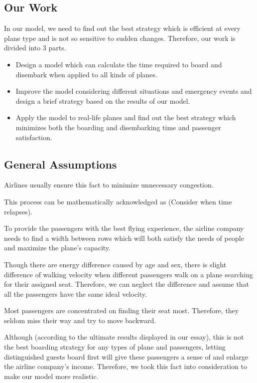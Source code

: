 \documentclass{article}
\theoremstyle{definition}
\theoremstyle{remark}
\numberwithin{equation}{section}
\begin{document}
	\subsection{Our Work}
	In our model, we need to find out the best strategy which is efficient at every plane type and is not so sensitive to sudden changes. Therefore, our work is divided into 3 parts.
	\begin{itemize}
		\item Design a model which can calculate the time required to board and disembark when applied to all kinds of planes.
		\item Improve the model considering different situations and emergency events and design a brief strategy based on the results of our model.
		\item Apply the model to real-life planes and find out the best strategy which minimizes both the boarding and disembarking time and passenger satisfaction.
	\end{itemize}
	\subsection{General Assumptions}
	\begin{enumerate}

		Airlines usually ensure this fact to minimize unnecessary congestion.

		This process can be mathematically acknowledged as  (Consider when time relapses).

		To provide the passengers with the best flying experience, the airline company needs to find a width between rows which will both satisfy the needs of people and maximize the plane's capacity.

		Though there are energy difference caused by age and sex, there is slight difference of walking velocity when different passengers walk on a plane searching for their assigned seat. Therefore, we can neglect the difference and assume that all the passengers have the same ideal velocity.

		Most passengers are concentrated on finding their seat most. Therefore, they seldom miss their way and try to move backward.

		Although (according to the ultimate results displayed in our essay), this is not the best boarding strategy for any types of plane and passengers, letting distinguished guests board first will give these passengers a sense of  and enlarge the airline company's income. Therefore, we took this fact into consideration to make our model more realistic.
	\end{enumerate}
\end{document}
